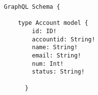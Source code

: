

\begin{lstlisting}[caption={GraphQL Schema.graphql},
label=lst:React Greeting ,basicstyle=\ttfamily\small ] GraphQL Schema {

    type Account model {
        id: ID!
        accountid: String!
        name: String!
        email: String!
        num: Int!
        status: String!

      }


\end{lstlisting}

